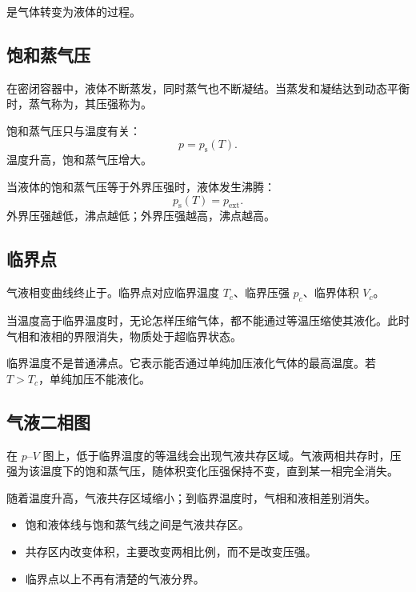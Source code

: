 是气体转变为液体的过程。

\subsection{饱和蒸气压}

在密闭容器中，液体不断蒸发，同时蒸气也不断凝结。当蒸发和凝结达到动态平衡时，蒸气称为，其压强称为。

饱和蒸气压只与温度有关：
\[
  p=p_{\mathrm s}(T).
\]
温度升高，饱和蒸气压增大。

\begin{KeyBox}[沸腾条件]
当液体的饱和蒸气压等于外界压强时，液体发生沸腾：
\[
  p_{\mathrm s}(T)=p_{\mathrm{ext}}.
\]
外界压强越低，沸点越低；外界压强越高，沸点越高。
\end{KeyBox}

\subsection{临界点}

气液相变曲线终止于。临界点对应临界温度 \(T_c\)、临界压强 \(p_c\)、临界体积 \(V_c\)。

当温度高于临界温度时，无论怎样压缩气体，都不能通过等温压缩使其液化。此时气相和液相的界限消失，物质处于超临界状态。

\begin{WarnBox}[临界温度的意义]
临界温度不是普通沸点。它表示能否通过单纯加压液化气体的最高温度。若 \(T>T_c\)，单纯加压不能液化。
\end{WarnBox}

\subsection{气液二相图}

在 \(p\)--\(V\) 图上，低于临界温度的等温线会出现气液共存区域。气液两相共存时，压强为该温度下的饱和蒸气压，随体积变化压强保持不变，直到某一相完全消失。

随着温度升高，气液共存区域缩小；到临界温度时，气相和液相差别消失。

\begin{KeyBox}[气液二相图的读法]
\begin{itemize}
  \item 饱和液体线与饱和蒸气线之间是气液共存区。
  \item 共存区内改变体积，主要改变两相比例，而不是改变压强。
  \item 临界点以上不再有清楚的气液分界。
\end{itemize}
\end{KeyBox}

